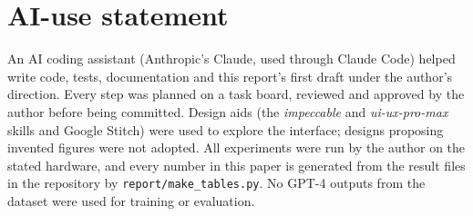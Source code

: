 \documentclass[conference]{IEEEtran}
\newcommand{\code}[1]{\texttt{\small #1}}
\begin{document}



\appendices
\section{AI-use statement}
An AI coding assistant (Anthropic's Claude, used through Claude Code) helped write code, tests, documentation and this report's first draft under the author's direction. Every step was planned on a task board, reviewed and approved by the author before being committed. Design aids (the \emph{impeccable} and \emph{ui-ux-pro-max} skills and Google Stitch) were used to explore the interface; designs proposing invented figures were not adopted. All experiments were run by the author on the stated hardware, and every number in this paper is generated from the result files in the repository by \code{report/make\_tables.py}. No GPT-4 outputs from the dataset were used for training or evaluation.
\end{document}
